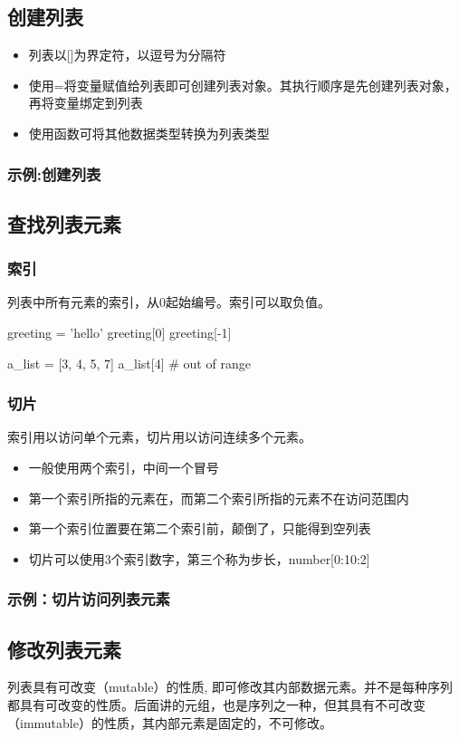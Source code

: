 \subsection{创建列表}
\begin{itemize}
\item 列表以[]为界定符，以逗号为分隔符
\item 使用=将变量赋值给列表即可创建列表对象。其执行顺序是先创建列表对象，再将变量绑定到列表
\item 使用函数可将其他数据类型转换为列表类型
\end{itemize}
\subsubsection{示例:创建列表}
\subsection{查找列表元素}
\subsubsection{索引}
列表中所有元素的索引，从0起始编号。索引可以取负值。
\begin{python}
greeting = 'hello'
greeting[0]
greeting[-1]

a_list = [3, 4, 5, 7]
a_list[4] # out of range
\end{python}
\subsubsection{切片}
索引用以访问单个元素，切片用以访问连续多个元素。
\begin{itemize}
\item 一般使用两个索引，中间一个冒号
\item 第一个索引所指的元素在，而第二个索引所指的元素不在访问范围内
\item 第一个索引位置要在第二个索引前，颠倒了，只能得到空列表
\item 切片可以使用3个索引数字，第三个称为步长，number[0:10:2]
\end{itemize}
\subsubsection{示例：切片访问列表元素}
\subsection{修改列表元素}
列表具有可改变（mutable）的性质, 即可修改其内部数据元素。并不是每种序列都具有可改变的性质。后面讲的元组，也是序列之一种，但其具有不可改变（immutable）的性质，其内部元素是固定的，不可修改。
